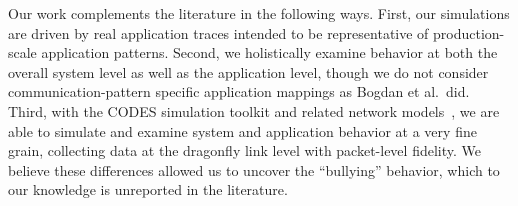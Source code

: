 Our work complements the literature in the following ways. First, our simulations are driven by real application traces intended to be representative of production-scale application patterns. Second, we holistically examine behavior at both the overall system level as well as the application level, though we do not consider communication-pattern specific application mappings as Bogdan et al.\ did. Third, with the CODES simulation toolkit and related network models~\cite{codes, codes-dragonfly},  
we are able to simulate and examine system and application behavior at a very fine grain, collecting data at the dragonfly link level with packet-level fidelity. We believe these differences allowed us to uncover the ``bullying'' behavior, which to our knowledge is unreported in the literature.
